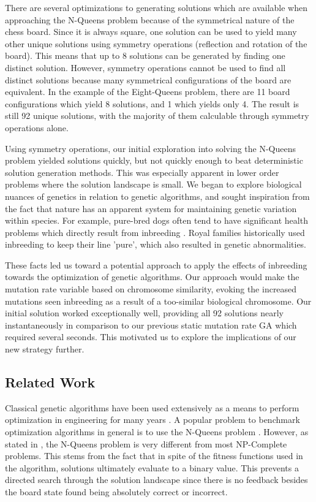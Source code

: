 \documentclass{sig-alternate}
\begin{document}
There are several optimizations to generating solutions which are available when approaching the N-Queens problem because of the symmetrical nature of the chess board. Since it is always square, one solution can be used to yield many other unique solutions using symmetry operations (reflection and rotation of the board). This means that up to 8 solutions can be generated by finding one distinct solution. However, symmetry operations cannot be used to find all distinct solutions because many symmetrical configurations of the board are equivalent. In the example of the Eight-Queens problem, there are 11 board configurations which yield 8 solutions, and 1 which yields only 4. The result is still 92 unique solutions, with the majority of them calculable through symmetry operations alone.

Using symmetry operations, our initial exploration into solving the N-Queens problem yielded solutions quickly, but not quickly enough to beat deterministic solution generation methods. This was especially apparent in lower order problems where the solution landscape is small. We began to explore biological nuances of genetics in relation to genetic algorithms, and sought inspiration from the fact that nature has an apparent system for maintaining genetic variation within species. For example, pure-bred dogs often tend to have significant health problems which directly result from inbreeding \cite{clark1983medical}. Royal families historically used inbreeding to keep their line 'pure', which also resulted in genetic abnormalities\cite{mannucci2001hemophilias}.

These facts led us toward a potential approach to apply the effects of inbreeding towards the optimization of genetic algorithms. Our approach would make the mutation rate variable based on chromosome similarity, evoking the increased mutations seen inbreeding as a result of a too-similar biological chromosome. Our initial solution worked exceptionally well, providing all 92 solutions nearly instantaneously in comparison to our previous static mutation rate GA which required several seconds. This motivated us to explore the implications of our new strategy further.

\subsection{Related Work}
Classical genetic algorithms have been used extensively as a means to perform optimization in engineering for many years \cite{goldberg1994genetic,srinivas1994genetic,de1989using}. A popular problem to benchmark optimization algorithms in general is to use the N-Queens problem \cite{homaifar1992queens,crawford1992solving}. However, as stated in \cite{crawford1992solving}, the N-Queens problem is very different from most NP-Complete problems. This stems from the fact that in spite of the fitness functions used in the algorithm, solutions ultimately evaluate to a binary value. This prevents a directed search through the solution landscape since there is no feedback besides the board state found being absolutely correct or incorrect. 
\end{document}
